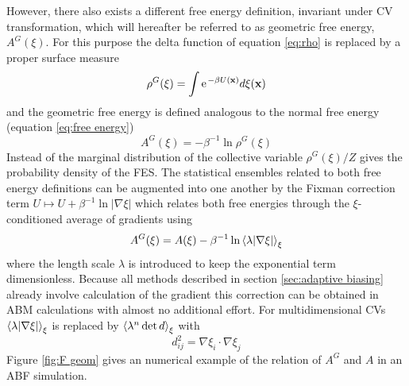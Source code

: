 However, there also exists a different free energy definition, invariant under CV transformation, which will hereafter be referred to as geometric free energy, $A^G(\xi)$.\autocite{hartmann2011two}
For this purpose the delta function of equation \ref{eq:rho} is replaced by a proper surface measure
\begin{equation}
  \rho^G (\xi) = \int \e^{-\beta U(\textbf{x})} d\xi(\textbf{x})
\end{equation}
and the geometric free energy is defined analogous to the normal free energy (equation \ref{eq:free energy})
\begin{equation}
  A^G(\xi) = -\beta^{-1}\ln \rho^G(\xi)
\end{equation}
Instead of the marginal distribution of the collective variable $\rho^G(\xi)/Z$ gives the probability density of the FES.
The statistical ensembles related to both free energy definitions can be augmented into one another by the Fixman correction term $U \mapsto U + \beta^{-1}\ln |\nabla \xi|$ which relates both free energies through the $\xi$-conditioned average of gradients using
\begin{equation}
  A^G(\xi) = A(\xi) - \beta^{-1}\ln\braket{\lambda |\nabla \xi|}_\xi
  \label{eq:f geom}
\end{equation}
where the length scale $\lambda$ is introduced to keep the exponential term dimensionless. Because all methods described in section \ref{sec:adaptive biasing} already involve calculation of the gradient this correction can be obtained in ABM calculations with almost no additional effort.\autocite{bal2020free} For multidimensional CVs $\braket{\lambda|\nabla\xi|}_\xi$ is replaced by $\braket{\lambda^n \det d}_\xi$ with
\begin{equation}
  d^2_{ij} = \nabla \xi_i \cdot \nabla \xi_j
\end{equation}
Figure \ref{fig:F geom} gives an numerical example of the relation of $A^G$ and $A$ in an ABF simulation.
